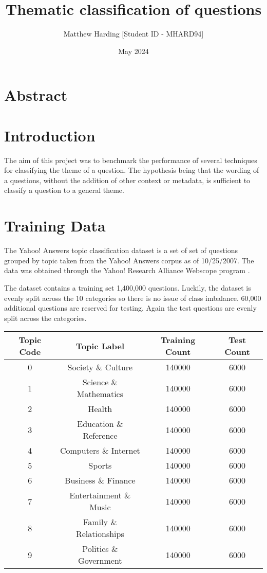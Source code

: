 \documentclass{article}
\title{Thematic classification of questions}
\author{Matthew Harding [Student ID - MHARD94]}
\date{May 2024}
\begin{document}
\maketitle

\section{Abstract}


\section{Introduction}

The aim of this project was to benchmark the performance of several techniques for classifying the theme of a question. The hypothesis being that 
the wording of a questions, without the addition of other context or metadata, is sufficient to classify a question to a general theme.
 

\section{Training Data}

The Yahoo! Answers topic classification dataset \cite{huggingface_dataset} is a set of set of questions grouped by topic taken from the Yahoo! Answers corpus as of 10/25/2007.
The data was obtained through the Yahoo! Research Alliance Webscope program \cite{yahoo_webscope}.


The dataset contains a training set 1,400,000 questions. Luckily, the dataset is evenly split across the 10 categories so there is no issue of class imbalance. 
60,000 additional questions are reserved for testing. Again the test questions are evenly split across the categories. 

\begin{center}
    \begin{tabular}{||c c c c||} 
     \hline
     Topic Code & Topic Label & Training Count & Test Count \\ [0.5ex] 
     \hline\hline
     0 & Society \& Culture & 140000 & 6000 \\ 
     \hline
     1 & Science \& Mathematics & 140000 & 6000 \\ 
     \hline
     2 & Health & 140000 & 6000 \\
     \hline
     3 & Education \& Reference & 140000 & 6000 \\
     \hline
     4 & Computers \& Internet & 140000 & 6000 \\
     \hline
     5 & Sports & 140000 & 6000 \\ 
     \hline
     6 & Business \& Finance & 140000 & 6000 \\ 
     \hline
     7 & Entertainment \& Music & 140000 & 6000 \\
     \hline
     8 & Family \& Relationships & 140000 & 6000 \\
     \hline
     9 & Politics \& Government & 140000 & 6000 \\ [1ex] 
     \hline
    \end{tabular}
    \end{center}
\end{document}

